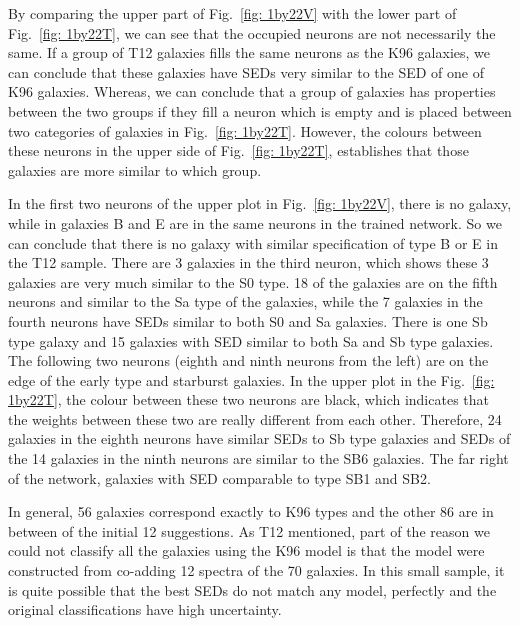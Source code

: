 \documentclass[useAMS,usenatbib]{mn2e}
\begin{document}
            By comparing the upper part of Fig.~\ref{fig: 1by22V} with the lower part of Fig.~\ref{fig: 1by22T}, we can see that the occupied neurons are not necessarily the same.
            If a group of T12 galaxies fills the same neurons as the K96 galaxies, we can conclude that these galaxies have SEDs very similar to the SED of one of K96 galaxies.
            Whereas, we can conclude that a group of galaxies has properties between the two groups if they fill a neuron which is empty and is placed between two categories of galaxies in Fig.~\ref{fig: 1by22T}.
            However, the colours between these neurons in the upper side of Fig.~\ref{fig: 1by22T}, establishes that those galaxies are more similar to which group. 
            
            In the first two neurons of the upper plot in Fig.~\ref{fig: 1by22V}, there is no galaxy, while in galaxies B and E are in the same neurons in the trained network.
            So we can conclude that there is no galaxy with similar specification of type B or E in the T12 sample.
            There are 3 galaxies in the third neuron, which shows these 3 galaxies are very much similar to the S0 type. 
            18 of the galaxies are on the fifth neurons and similar to the Sa type of the galaxies, while the 7 galaxies in the fourth neurons have SEDs similar to both S0 and Sa galaxies.
            There is one Sb type galaxy and 15 galaxies with SED similar to both Sa and Sb type galaxies.
            The following two neurons (eighth and ninth neurons from the left) are on the edge of the early type and starburst galaxies.
            In the upper plot in the  Fig.~\ref{fig: 1by22T}, the colour between these two neurons are black, which indicates that the weights between these two are really different from each other.
            Therefore, 24 galaxies in the eighth neurons have similar SEDs to Sb type galaxies and SEDs of the 14 galaxies in the ninth neurons are similar to the SB6 galaxies.
            The far right of the network, galaxies with SED comparable to type SB1 and SB2.
            
            In general, 56 galaxies correspond exactly to K96 types and the other 86 are in between of the initial 12 suggestions.
            As T12 mentioned, part of the reason we could not classify all the galaxies using the K96 model is that the model were constructed from co-adding 12 spectra of the 70 galaxies.
            In this small sample, it is quite possible that the best SEDs do not match any model, perfectly and the original classifications have high uncertainty.
            
\end{document}
